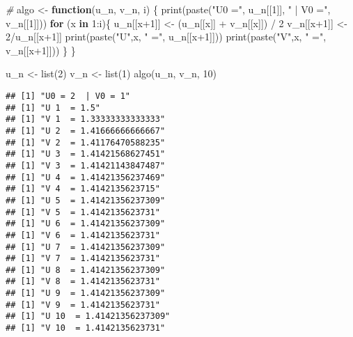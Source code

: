 \documentclass[
]{article}
\newenvironment{Shaded}{\begin{snugshade}}{\end{snugshade}}
\newcommand{\CommentTok}[1]{\textcolor[rgb]{0.56,0.35,0.01}{\textit{#1}}}
\newcommand{\ControlFlowTok}[1]{\textcolor[rgb]{0.13,0.29,0.53}{\textbf{#1}}}
\newcommand{\DecValTok}[1]{\textcolor[rgb]{0.00,0.00,0.81}{#1}}
\newcommand{\FunctionTok}[1]{\textcolor[rgb]{0.00,0.00,0.00}{#1}}
\newcommand{\NormalTok}[1]{#1}
\newcommand{\OtherTok}[1]{\textcolor[rgb]{0.56,0.35,0.01}{#1}}
\newcommand{\SpecialCharTok}[1]{\textcolor[rgb]{0.00,0.00,0.00}{#1}}
\newcommand{\StringTok}[1]{\textcolor[rgb]{0.31,0.60,0.02}{#1}}
\begin{document}
\begin{Shaded}
\begin{Highlighting}[]
\CommentTok{\#}
\NormalTok{algo }\OtherTok{\textless{}{-}} \ControlFlowTok{function}\NormalTok{(u\_n, v\_n, i) \{}
  \FunctionTok{print}\NormalTok{(}\FunctionTok{paste}\NormalTok{(}\StringTok{"U0 ="}\NormalTok{, u\_n[[}\DecValTok{1}\NormalTok{]], }\StringTok{" | V0 ="}\NormalTok{, v\_n[[}\DecValTok{1}\NormalTok{]]))}
  \ControlFlowTok{for}\NormalTok{ (x }\ControlFlowTok{in} \DecValTok{1}\SpecialCharTok{:}\NormalTok{i)\{}
\NormalTok{    u\_n[[x}\SpecialCharTok{+}\DecValTok{1}\NormalTok{]] }\OtherTok{\textless{}{-}}\NormalTok{ (u\_n[[x]] }\SpecialCharTok{+}\NormalTok{ v\_n[[x]]) }\SpecialCharTok{/} \DecValTok{2}
\NormalTok{    v\_n[[x}\SpecialCharTok{+}\DecValTok{1}\NormalTok{]] }\OtherTok{\textless{}{-}} \DecValTok{2}\SpecialCharTok{/}\NormalTok{u\_n[[x}\SpecialCharTok{+}\DecValTok{1}\NormalTok{]]}
    \FunctionTok{print}\NormalTok{(}\FunctionTok{paste}\NormalTok{(}\StringTok{"U"}\NormalTok{,x, }\StringTok{" ="}\NormalTok{, u\_n[[x}\SpecialCharTok{+}\DecValTok{1}\NormalTok{]]))}
    \FunctionTok{print}\NormalTok{(}\FunctionTok{paste}\NormalTok{(}\StringTok{"V"}\NormalTok{,x, }\StringTok{" ="}\NormalTok{, v\_n[[x}\SpecialCharTok{+}\DecValTok{1}\NormalTok{]]))}
\NormalTok{  \}}
\NormalTok{\}}

\NormalTok{u\_n }\OtherTok{\textless{}{-}} \FunctionTok{list}\NormalTok{(}\DecValTok{2}\NormalTok{)}
\NormalTok{v\_n }\OtherTok{\textless{}{-}} \FunctionTok{list}\NormalTok{(}\DecValTok{1}\NormalTok{)}
\FunctionTok{algo}\NormalTok{(u\_n, v\_n, }\DecValTok{10}\NormalTok{)}
\end{Highlighting}
\end{Shaded}

\begin{verbatim}
## [1] "U0 = 2  | V0 = 1"
## [1] "U 1  = 1.5"
## [1] "V 1  = 1.33333333333333"
## [1] "U 2  = 1.41666666666667"
## [1] "V 2  = 1.41176470588235"
## [1] "U 3  = 1.41421568627451"
## [1] "V 3  = 1.41421143847487"
## [1] "U 4  = 1.41421356237469"
## [1] "V 4  = 1.4142135623715"
## [1] "U 5  = 1.41421356237309"
## [1] "V 5  = 1.4142135623731"
## [1] "U 6  = 1.41421356237309"
## [1] "V 6  = 1.4142135623731"
## [1] "U 7  = 1.41421356237309"
## [1] "V 7  = 1.4142135623731"
## [1] "U 8  = 1.41421356237309"
## [1] "V 8  = 1.4142135623731"
## [1] "U 9  = 1.41421356237309"
## [1] "V 9  = 1.4142135623731"
## [1] "U 10  = 1.41421356237309"
## [1] "V 10  = 1.4142135623731"
\end{verbatim}
\end{document}
